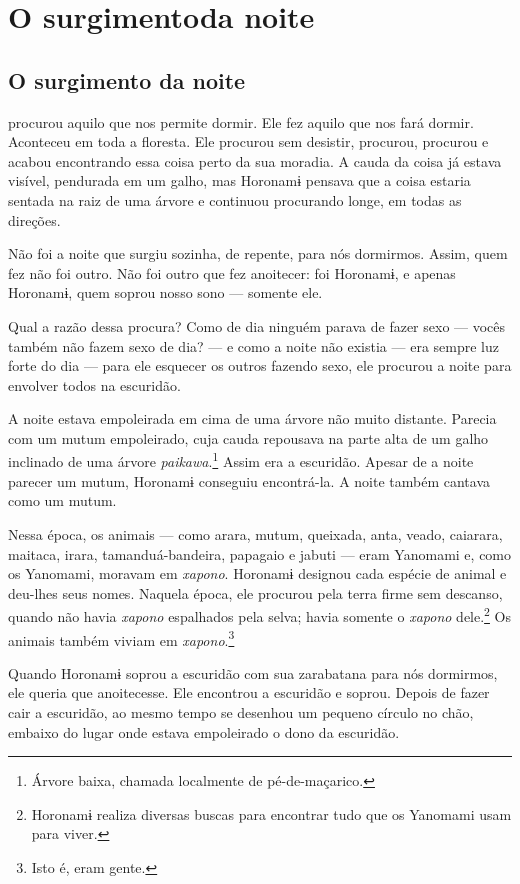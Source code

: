 \part[O surgimento da noite]{O surgimento\break da noite}

\chapter{O surgimento da noite}

 procurou aquilo que nos permite dormir. Ele fez aquilo que nos
fará dormir. Aconteceu em toda a floresta. Ele procurou sem desistir,
procurou, procurou e acabou encontrando essa coisa perto da sua moradia.
A cauda da coisa já estava visível, pendurada em um galho, mas Horonamɨ
pensava que a coisa estaria sentada na raiz de uma árvore e continuou
procurando longe, em todas as direções. 

Não foi a noite que surgiu sozinha, de repente, para nós dormirmos.
Assim, quem fez não foi outro. Não foi outro que fez anoitecer: foi
Horonamɨ, e apenas Horonamɨ, quem soprou nosso sono --- somente ele. 

Qual a razão dessa procura? Como de dia ninguém parava de fazer sexo ---
vocês também não fazem sexo de dia? --- e como a noite não existia ---
era sempre luz forte do dia --- para ele esquecer os outros fazendo
sexo, ele procurou a noite para envolver todos na escuridão. 

A noite estava empoleirada em cima de uma árvore não muito distante.
Parecia com um mutum empoleirado, cuja cauda repousava na parte alta de
um galho inclinado de uma árvore \textit{paikawa}.\footnote{Árvore baixa, chamada localmente de pé-de-maçarico.}  Assim era a escuridão. Apesar de a noite parecer um mutum, Horonamɨ conseguiu
encontrá-la. A noite também cantava como um mutum. 

Nessa época, os animais --- como arara, mutum, queixada, anta, veado,
caiarara, maitaca, irara, tamanduá-bandeira, papagaio e jabuti --- eram
Yanomami e, como os Yanomami, moravam em \textit{xapono}. Horonamɨ designou cada
espécie de animal e deu-lhes seus nomes. Naquela época, ele procurou
pela terra firme sem descanso, quando não havia \textit{xapono} espalhados pela
selva; havia somente o \textit{xapono} dele.\footnote{  Horonamɨ realiza diversas buscas 
para encontrar tudo que os Yanomami usam para viver.}  Os animais também
viviam em \textit{xapono}.\footnote{Isto é, eram gente.} 

Quando Horonamɨ soprou a escuridão com sua zarabatana para nós
dormirmos, ele queria que anoitecesse. Ele encontrou a escuridão e
soprou. Depois de fazer cair a escuridão, ao mesmo tempo se desenhou um
pequeno círculo no chão, embaixo do lugar onde estava empoleirado o dono
da escuridão.

